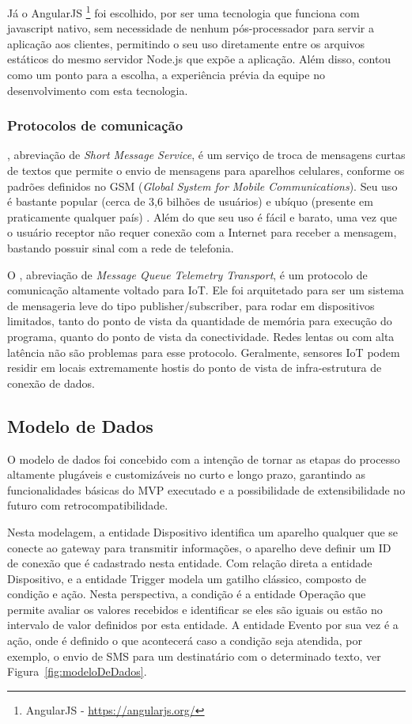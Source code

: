 Já o AngularJS \footnote{AngularJS - \url{https://angularjs.org/}} foi escolhido, por ser uma tecnologia que funciona com javascript nativo, sem necessidade de nenhum pós-processador para servir a aplicação aos clientes, permitindo o seu uso diretamente entre os arquivos estáticos do mesmo servidor Node.js que expõe a aplicação. Além disso, contou como um ponto para a escolha, a experiência prévia da equipe no desenvolvimento com esta tecnologia.

\subsubsection{Protocolos de comunicação}
\label{protocolos}

\label{sms}, abreviação de \textit{Short Message Service}, é um serviço de troca de mensagens curtas de textos que permite o envio de mensagens para aparelhos celulares, conforme os padrões definidos no GSM (\textit{Global System for Mobile Communications}). Seu uso é bastante popular (cerca de 3,6 bilhões de usuários) \cite{SMS} e ubíquo (presente em praticamente qualquer país) \cite{SMSItu}. Além do que seu uso é fácil e barato, uma vez que o usuário receptor não requer conexão com a Internet para receber a mensagem, bastando possuir sinal com a rede de telefonia.

O \label{mqtt}, abreviação de \textit{Message Queue Telemetry Transport}, é um protocolo de comunicação altamente voltado para IoT. Ele foi arquitetado para ser um sistema de mensageria leve do tipo publisher/subscriber, para rodar em dispositivos limitados, tanto do ponto de vista da quantidade de memória para execução do programa, quanto do ponto de vista da conectividade. Redes lentas ou com alta latência não são problemas para esse protocolo. Geralmente, sensores IoT podem residir em locais extremamente hostis do ponto de vista de infra-estrutura de conexão de dados.

\subsection{Modelo de Dados}
O modelo de dados foi concebido com a intenção de tornar as etapas do processo altamente plugáveis e customizáveis no curto e longo prazo, garantindo as funcionalidades básicas do MVP \cite{MVP} executado e a possibilidade de extensibilidade no futuro com retrocompatibilidade. 

Nesta modelagem, a entidade Dispositivo identifica um aparelho qualquer que se conecte ao gateway para transmitir informações, o aparelho deve definir um ID de conexão que é cadastrado nesta entidade. Com relação direta a entidade Dispositivo, e a entidade Trigger modela um gatilho clássico, composto de condição e ação. Nesta perspectiva, a condição é a entidade Operação que permite avaliar os valores recebidos e identificar se eles são iguais ou estão no intervalo de valor definidos por esta entidade. A entidade Evento por sua vez é a ação, onde é definido o que acontecerá caso a condição seja atendida, por exemplo, o envio de SMS para um destinatário com o determinado texto, ver Figura~\ref{fig:modeloDeDados}.

